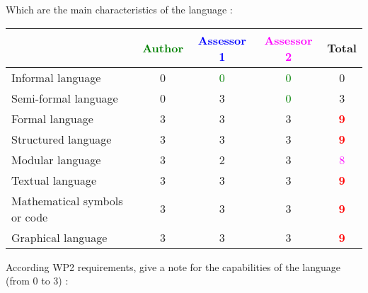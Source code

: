 Which are the main characteristics of the language :

\begin{tabular}{|l | c | c | c | c|}
\hline
& \textcolor{green}{Author} & \textcolor{blue}{Assessor 1} & \textcolor{magenta}{Assessor 2} & Total \\
\hline 
Informal language &  0  & \textcolor{green}{0} & \textcolor{green}{0}   &  0 \\
\hline 
Semi-formal language &  0  & 3     & \textcolor{green}{0}   &  3 \\
\hline
Formal language &  3  & 3     &3 &  \textcolor{red}{\textbf{9}} \\
\hline
Structured language &  3  & 3     &3 & \textcolor{red}{\textbf{9}} \\
\hline
Modular language &  3  & 2     &3 & \textcolor{magenta}{8} \\
\hline
Textual language & 3     & 3     &3 & \textcolor{red}{\textbf{9}} \\
\hline
Mathematical symbols or code & 3     & 3     &3 & \textcolor{red}{\textbf{9}} \\
\hline
Graphical language & 3     & 3     &3 & \textcolor{red}{\textbf{9}} \\
\hline
\end{tabular}

According WP2 requirements, give a note for the capabilities of the language (from 0 to 3) :

